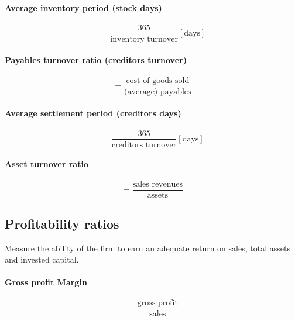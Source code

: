 \documentclass[a4paper] {scrartcl}
\begin{document}
\paragraph{Average inventory period (stock days)} %
\label{par:average_inventory_period}
\begin{equation}
	= \frac{365}{\text{inventory turnover}} [\text{days}]
\end{equation}

\paragraph{Payables turnover ratio (creditors turnover)}
\begin{equation}
	= \frac{\text{cost of goods sold}}{\text{(average) payables}}
\end{equation}

\paragraph{Average settlement period (creditors days)} %
\label{par:average_inventory_period}
\begin{equation}
	= \frac{365}{\text{creditors turnover}} [\text{days}]
\end{equation}

\paragraph{Asset turnover ratio} %
\label{par:asset_turnover_ratio}
\begin{equation}
	= \frac{\text{sales revenues}}{\text{assets}}
\end{equation}


\subsection{Profitability ratios} %
\label{sub:profitability_ratios}


Measure the ability of the firm to earn an adequate return on sales, total assets and invested capital.

\paragraph{Gross profit Margin} %
\label{par:gross_profit_margin}
\begin{equation}
	=\frac{\text{gross profit}}{\text{sales}}
\end{equation}
\end{document}
